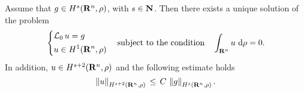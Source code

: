 \begin{lemma}
    Assume that $g \in H^{s}(\mathbf R^n, \rho)$,
    with $s\in \mathbf N$. Then there exists a unique solution of the problem
    $$
    \left\{ 
        \begin{aligned}
            &\mathcal L_0 \, u = g   \\
            &u \in H^{1}(\mathbf R^n, \rho)
        \end{aligned} 
    \right .
    \quad \text{subject to the condition} \quad \int_{\mathbf R^n} u \, \,\mathrm d \rho = 0.
    $$
    In addition, $u \in H^{s+2}(\mathbf R^n, \rho)$ and the following estimate holds
    $$
        \left\| u \right\|_{H^{s+2}(\mathbf R^n, \rho)} \,\leq\, C \, \left\| g \right\|_{H^{s}(\mathbf R^n, \rho)}.
    $$
    \label{lemma: regularity of the solution of the cell problem}
\end{lemma}
